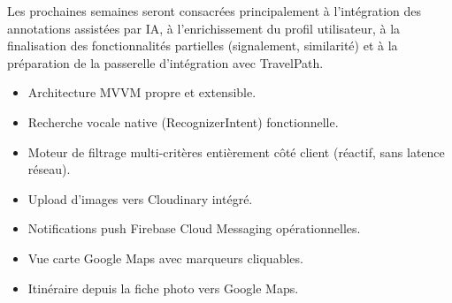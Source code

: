 \documentclass[12pt, a4paper]{report}
\begin{document}
Les prochaines semaines seront consacrées principalement à l'intégration des annotations
assistées par IA, à l'enrichissement du profil utilisateur, à la finalisation des
fonctionnalités partielles (signalement, similarité) et à la préparation de la passerelle
d'intégration avec TravelPath.

\begin{successbox}
\begin{itemize}[noitemsep]
  \item Architecture MVVM propre et extensible.
  \item Recherche vocale native (RecognizerIntent) fonctionnelle.
  \item Moteur de filtrage multi-critères entièrement côté client (réactif, sans latence réseau).
  \item Upload d'images vers Cloudinary intégré.
  \item Notifications push Firebase Cloud Messaging opérationnelles.
  \item Vue carte Google Maps avec marqueurs cliquables.
  \item Itinéraire depuis la fiche photo vers Google Maps.
\end{itemize}
\end{successbox}
\end{document}
